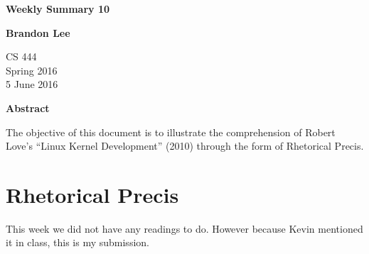 \documentclass[letterpaper,10pt,titlepage]{article}
\begin{document}
\begin{titlepage}
    \begin{center}
        \vspace*{3.5cm}

        \textbf{Weekly Summary 10}

        \vspace{0.5cm}

        \textbf{Brandon Lee}

        \vspace{0.8cm}

        CS 444\\
        Spring 2016\\
        5 June 2016\\

        \vspace{1cm}

        \textbf{Abstract}\\

        \vspace{0.5cm}

        The objective of this document is to illustrate the comprehension of Robert Love's “Linux Kernel Development” (2010) through the form of Rhetorical Precis.


        \vfill



    \end{center}
\end{titlepage}

\newpage

\section{Rhetorical Precis}

This week we did not have any readings to do. However because Kevin mentioned it in class, this is my submission.
\end{document}
